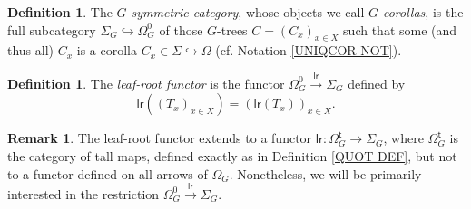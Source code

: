 \documentclass[a4paper,10pt
,draft
]{article}%
\numberwithin{equation}{section}
\numberwithin{figure}{section}
\theoremstyle{definition} %
\newtheorem{definition}[equation]{Definition}%
\newtheorem{remark}[equation]{Remark}%
\newcommand{\1}{\ensuremath{\mathbbm 1}}%
\begin{document}
\begin{definition}\label{GSYMCAT DEF}
	The \textit{$G$-symmetric category},
	whose objects we call \textit{$G$-corollas}, is the full subcategory 
	$\Sigma_G \hookrightarrow \Omega_{G}^0$ of those $G$-trees
	$C = (C_x)_{x \in X}$ such that some (and thus all) $C_x$ is a corolla $C_x \in \Sigma \hookrightarrow \Omega$
	(cf. Notation \ref{UNIQCOR NOT}).
\end{definition}


\begin{definition}
      The \textit{leaf-root functor} is the functor $\Omega_{G}^0 \xrightarrow{\mathsf{lr}} \Sigma_G$ defined by 
      \[
            \mathsf{lr}\left((T_x)_{x \in X}\right)=
            \left(\mathsf{lr}(T_x)\right)_{x \in X}.
      \]
\end{definition}


\begin{remark}
	The leaf-root functor extends 
	to a functor $\mathsf{lr} \colon \Omega^{\mathsf{t}}_G \to \Sigma_G$, 
	where $\Omega^{\mathsf{t}}_G$ is the category of tall maps, defined exactly as in Definition \ref{QUOT DEF}, but not to a functor defined on all arrows of $\Omega_G$.
	Nonetheless, we will be primarily interested in the 
 restriction  
	$\Omega_{G}^0 \xrightarrow{\mathsf{lr}} \Sigma_G$.
\end{remark}
\end{document}
